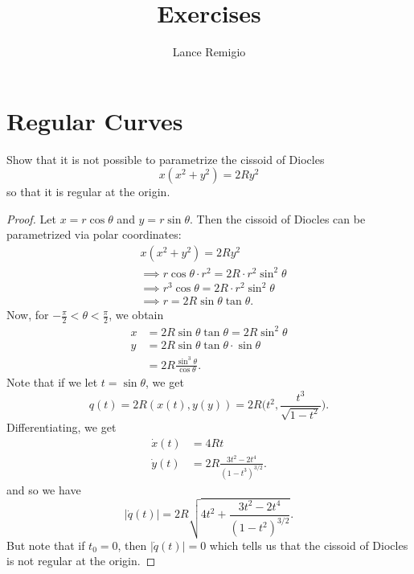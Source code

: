 \documentclass[a4paper]{article}
\title{Exercises}
\author{Lance Remigio}
\begin{document}
\maketitle

\section{Regular Curves}

\begin{problem}
    Show that it is not possible to parametrize the cissoid of Diocles 
    \[  x (x^{2} + y^{2}) = 2 R y^{2} \]
    so that it is regular at the origin.
\end{problem}
\begin{proof}
Let \( x = r \cos \theta   \) and \( y = r \sin \theta  \). Then the cissoid of Diocles can be parametrized via polar coordinates:
\begin{align*}
    &x(x^{2} + y^{2}) = 2 R y^{2} \\
    &\implies r \cos \theta \cdot r^{2} = 2 R \cdot r^{2} \sin^{2} \theta \\
    &\implies r^{3} \cos \theta = 2 R \cdot r^{2} \sin^{2} \theta \\
    &\implies r = 2 R \sin \theta \tan \theta. 
\end{align*}
Now, for \( - \frac{ \pi }{ 2 }  < \theta < \frac{ \pi  }{ 2  }  \), we obtain
\begin{align*}
    x &= 2 R \sin \theta \tan \theta = 2 R \sin^{2} \theta \\
    y &= 2 R \sin \theta \tan \theta \cdot \sin \theta \\
      &= 2 R \frac{ \sin^{3} \theta  }{  \cos \theta  }.
\end{align*}
Note that if we let \( t = \sin \theta  \), we get 
\[  q(t) = 2 R (x(t), y(y)) = 2 R \Big(  t^{2}, \frac{ t^{3} }{ \sqrt{ 1 - t^{2} }  }  \Big). \]
Differentiating, we get
\begin{align*}
    \dot{x}(t) &= 4 R t  \\
    \dot{y}(t) &= 2 R \frac{ 3 t^{2} - 2 t^{4} }{ (1 - t^{3})^{3/2} }.
\end{align*}
and so we have 
\[  | \dot{q}(t) |  = 2 R \sqrt{  4t^{2} + \frac{ 3t^{2} - 2t^{4} }{ (1 - t^{2})^{3/2} }  }. \]
But note that if \( {t}_{0} = 0  \), then \( | \dot{q}(t) |  = 0  \) which tells us that the cissoid of Diocles is not regular at the origin.
\end{proof}
\end{document}
